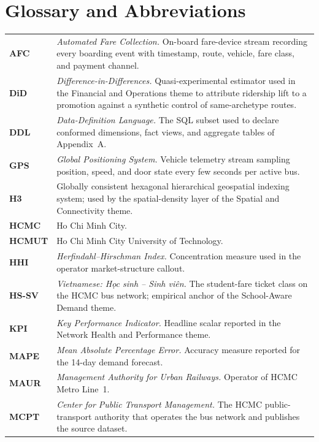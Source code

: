 \chapter*{Glossary and Abbreviations}

\begin{longtable}{@{}p{2.5cm}p{11cm}@{}}
\textbf{AFC} & \textit{Automated Fare Collection.} On-board fare-device stream recording every boarding event with timestamp, route, vehicle, fare class, and payment channel. \\[0.2cm]
\textbf{DiD} & \textit{Difference-in-Differences.} Quasi-experimental estimator used in the Financial and Operations theme to attribute ridership lift to a promotion against a synthetic control of same-archetype routes. \\[0.2cm]
\textbf{DDL} & \textit{Data-Definition Language.} The SQL subset used to declare conformed dimensions, fact views, and aggregate tables of Appendix~A. \\[0.2cm]
\textbf{GPS} & \textit{Global Positioning System.} Vehicle telemetry stream sampling position, speed, and door state every few seconds per active bus. \\[0.2cm]
\textbf{H3} & Globally consistent hexagonal hierarchical geospatial indexing system; used by the spatial-density layer of the Spatial and Connectivity theme. \\[0.2cm]
\textbf{HCMC} & Ho Chi Minh City. \\[0.2cm]
\textbf{HCMUT} & Ho Chi Minh City University of Technology. \\[0.2cm]
\textbf{HHI} & \textit{Herfindahl--Hirschman Index.} Concentration measure used in the operator market-structure callout. \\[0.2cm]
\textbf{HS-SV} & \textit{Vietnamese: H\d{o}c sinh -- Sinh vi\^{e}n.} The student-fare ticket class on the HCMC bus network; empirical anchor of the School-Aware Demand theme. \\[0.2cm]
\textbf{KPI} & \textit{Key Performance Indicator.} Headline scalar reported in the Network Health and Performance theme. \\[0.2cm]
\textbf{MAPE} & \textit{Mean Absolute Percentage Error.} Accuracy measure reported for the 14-day demand forecast. \\[0.2cm]
\textbf{MAUR} & \textit{Management Authority for Urban Railways.} Operator of HCMC Metro Line~1. \\[0.2cm]
\textbf{MCPT} & \textit{Center for Public Transport Management.} The HCMC public-transport authority that operates the bus network and publishes the source dataset. \\[0.2cm]

\end{longtable}
